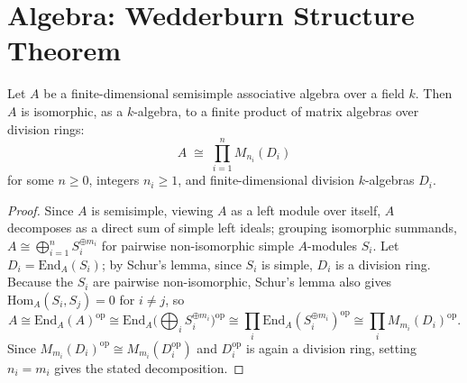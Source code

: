 \section{Algebra: Wedderburn Structure Theorem}

\begin{theorem}
Let $A$ be a finite-dimensional semisimple associative algebra over a field
$k$. Then $A$ is isomorphic, as a $k$-algebra, to a finite product of matrix
algebras over division rings:
\[
A \;\cong\; \prod_{i=1}^n M_{n_i}(D_i)
\]
for some $n \geq 0$, integers $n_i \geq 1$, and finite-dimensional division
$k$-algebras $D_i$.
\end{theorem}

\begin{proof}
Since $A$ is semisimple, viewing $A$ as a left module over itself, $A$
decomposes as a direct sum of simple left ideals; grouping isomorphic
summands, $A \cong \bigoplus_{i=1}^n S_i^{\oplus m_i}$ for pairwise
non-isomorphic simple $A$-modules $S_i$. Let $D_i = \mathrm{End}_A(S_i)$;
by Schur's lemma, since $S_i$ is simple, $D_i$ is a division ring. Because
the $S_i$ are pairwise non-isomorphic, Schur's lemma also gives
$\mathrm{Hom}_A(S_i, S_j) = 0$ for $i \neq j$, so
\[
A \cong \mathrm{End}_A(A)^{\mathrm{op}} \cong \mathrm{End}_A\Big(\bigoplus_i S_i^{\oplus m_i}\Big)^{\mathrm{op}}
\cong \prod_i \mathrm{End}_A(S_i^{\oplus m_i})^{\mathrm{op}}
\cong \prod_i M_{m_i}(D_i)^{\mathrm{op}}.
\]
Since $M_{m_i}(D_i)^{\mathrm{op}} \cong M_{m_i}(D_i^{\mathrm{op}})$ and
$D_i^{\mathrm{op}}$ is again a division ring, setting $n_i = m_i$ gives the
stated decomposition.
\end{proof}
